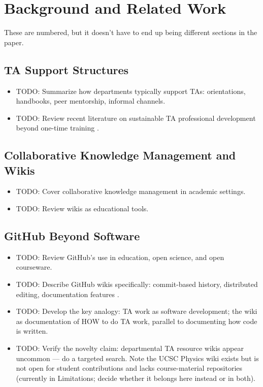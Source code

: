 \documentclass[11pt]{article}
\newcommand{\td}[1]{\item \textcolor{red!70!black}{TODO: #1}}
\begin{document}
\section{Background and Related Work}

These are numbered, but it doesn't have to end up being different sections in the paper. 

\subsection{TA Support Structures}
\begin{itemize}
  \td{Summarize how departments typically support TAs: orientations, handbooks, peer mentorship, informal channels.}
  \td{Review recent literature on sustainable TA professional development beyond one-time training \citep{sadera2024, freeman2026}.}
\end{itemize}

\subsection{Collaborative Knowledge Management and Wikis}
\begin{itemize}
  \td{Cover collaborative knowledge management in academic settings.}
  \td{Review wikis as educational tools.}
\end{itemize}

\subsection{GitHub Beyond Software}
\begin{itemize}
  \td{Review GitHub's use in education, open science, and open courseware.}
  \td{Describe GitHub wikis specifically: commit-based history, distributed editing, documentation features \citep{githubdocs2026a, githubdocs2026b}.}
  \td{Develop the key analogy: TA work as software development; the wiki as documentation of HOW to do TA work, parallel to documenting how code is written.}
  \td{Verify the novelty claim: departmental TA resource wikis appear uncommon --- do a targeted search. Note the UCSC Physics wiki exists but is not open for student contributions and lacks course-material repositories (currently in Limitations; decide whether it belongs here instead or in both).}
\end{itemize}
\end{document}

